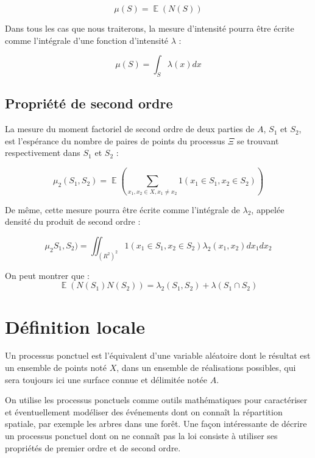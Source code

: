 \documentclass[
  11pt,
  french,
  A4paper,
  extrafontsizes,onecolumn,openright
  ]{memoir}
\theoremstyle{definition}
\theoremstyle{definition}
\theoremstyle{definition}
\theoremstyle{remark}
\begin{document}
\begin{equation}
  \mu(S)=\mathop{\mathbb{E}}(N(S))
  \label{eq:muSE}
\end{equation}

Dans tous les cas que nous traiterons, la mesure d'intensité pourra être
écrite comme l'intégrale d'une fonction d'intensité \(\lambda\) :

\begin{equation}
  \mu(S)=\int_S{\lambda(x)dx}
  \label{eq:muSint}
\end{equation}

\subsection{Propriété de second ordre}\label{propriete-de-second-ordre}

La mesure du moment factoriel de second ordre de deux parties de \(A\),
\(S_1\) et \(S_2\), est l'espérance du nombre de paires de points du
processus \(\Xi\) se trouvant respectivement dans \(S_1\) et \(S_2\) :

\begin{equation}
  \mu_2(S_1,S_2 ) = \mathop{\mathbb{E}}\left(\sum_{x_1 ,x_2 \in X, x_1 \ne x_2}{1(x_1 \in S_1, x_2 \in S_2)} \right)
  \label{eq:mu2}
\end{equation}

De même, cette mesure pourra être écrite comme l'intégrale de
\(\lambda_2\), appelée densité du produit de second ordre :

\begin{equation}
  \mu_2 S_1,S_2 ) = \iint_{(R^2)^2}{1(x_1 \in S_1, x_2 \in S_2) \lambda_2(x_1, x_2)dx_1 dx_2}
\end{equation}

On peut montrer \autocite{Moller2004} que :
\[ \mathop{\mathbb{E}}(N(S_1 )N(S_2 )) = \lambda_2(S_1,S_2)+\lambda(S_1 \cap S_2)\]

\section{Définition locale}\label{definition-locale}

Un processus ponctuel est l'équivalent d'une variable aléatoire dont le
résultat est un ensemble de points noté \(X\), dans un ensemble de
réalisations possibles, qui sera toujours ici une surface connue et
délimitée notée \(A\).

On utilise les processus ponctuels comme outils mathématiques pour
caractériser et éventuellement modéliser des événements dont on connaît
la répartition spatiale, par exemple les arbres dans une forêt. Une
façon intéressante de décrire un processus ponctuel dont on ne connaît
pas la loi consiste à utiliser ses propriétés de premier ordre et de
second ordre.
\end{document}
